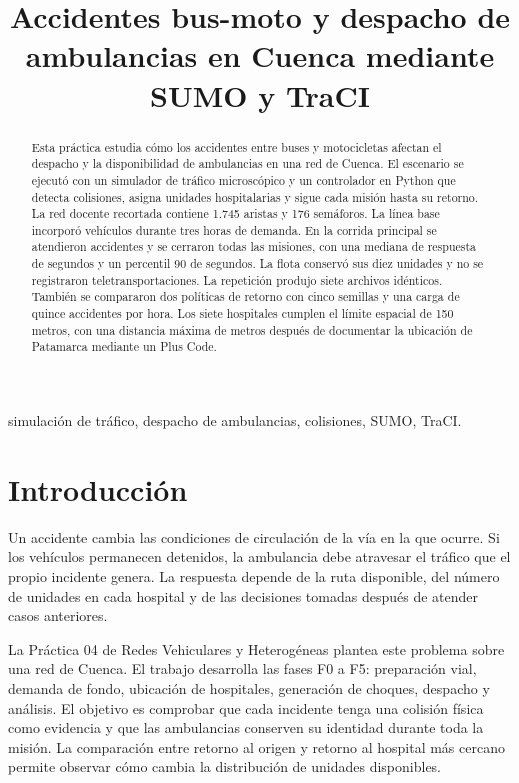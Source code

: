 \documentclass[conference,a4paper]{IEEEtran}
\begin{document}
\title{Accidentes bus-moto y despacho de ambulancias en Cuenca mediante SUMO y TraCI}
\author{\IEEEauthorblockN{\Autor}
}
\maketitle

\begin{abstract}
Esta práctica estudia cómo los accidentes entre buses y motocicletas afectan el despacho y la disponibilidad de ambulancias en una red de Cuenca. El escenario se ejecutó con un simulador de tráfico microscópico y un controlador en Python que detecta colisiones, asigna unidades hospitalarias y sigue cada misión hasta su retorno. La red docente recortada contiene 1.745 aristas y 176 semáforos. La línea base incorporó \Demanda{} vehículos durante tres horas de demanda. En la corrida principal se atendieron \Accidentes{} accidentes y se cerraron todas las misiones, con una mediana de respuesta de \Mediana{} segundos y un percentil 90 de \Pnoventa{} segundos. La flota conservó sus diez unidades y no se registraron teletransportaciones. La repetición produjo siete archivos idénticos. También se compararon dos políticas de retorno con cinco semillas y una carga de quince accidentes por hora. Los siete hospitales cumplen el límite espacial de 150 metros, con una distancia máxima de \GeoMax{} metros después de documentar la ubicación de Patamarca mediante un Plus Code.
\end{abstract}
\begin{IEEEkeywords}
simulación de tráfico, despacho de ambulancias, colisiones, SUMO, TraCI.
\end{IEEEkeywords}

\section{Introducción}
Un accidente cambia las condiciones de circulación de la vía en la que ocurre. Si los vehículos permanecen detenidos, la ambulancia debe atravesar el tráfico que el propio incidente genera. La respuesta depende de la ruta disponible, del número de unidades en cada hospital y de las decisiones tomadas después de atender casos anteriores.

La Práctica 04 de Redes Vehiculares y Heterogéneas plantea este problema sobre una red de Cuenca\cite{guia}. El trabajo desarrolla las fases F0 a F5: preparación vial, demanda de fondo, ubicación de hospitales, generación de choques, despacho y análisis. El objetivo es comprobar que cada incidente tenga una colisión física como evidencia y que las ambulancias conserven su identidad durante toda la misión. La comparación entre retorno al origen y retorno al hospital más cercano permite observar cómo cambia la distribución de unidades disponibles.
\end{document}
